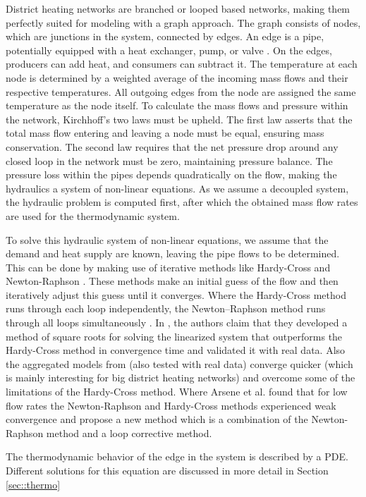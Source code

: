 District heating networks are branched or looped based networks, making them perfectly suited for modeling with a graph approach. The graph consists of nodes, which are junctions in the system, connected by edges. An edge is a pipe, potentially equipped with a heat exchanger, pump, or valve \cite{sibeijn2025economic}. On the edges, producers can add heat, and consumers can subtract it. The temperature at each node is determined by a weighted average of the incoming mass flows and their respective temperatures. All outgoing edges from the node are assigned the same temperature as the node itself. To calculate the mass flows and pressure within the network, Kirchhoff's two laws must be upheld. The first law asserts that the total mass flow entering and leaving a node must be equal, ensuring mass conservation. The second law requires that the net pressure drop around any closed loop in the network must be zero, maintaining pressure balance. The pressure loss within the pipes depends quadratically on the flow, making the hydraulics a system of non-linear equations. As we assume a decoupled system, the hydraulic problem is computed first, after which the obtained mass flow rates are used for the thermodynamic system. 

To solve this hydraulic system of non-linear equations, we assume that the demand and heat supply are known, leaving the pipe flows to be determined. This can be done by making use of iterative methods like Hardy-Cross \cite{HardyCross} and Newton-Raphson \cite{NewtonenHard}. These methods make an initial guess of the flow and then iteratively adjust this guess until it converges. Where the Hardy-Cross method runs through each loop independently, the Newton–Raphson method runs through all loops simultaneously \cite{NewtonenHard}. In \cite{STEVANOVIC}, the authors claim that they developed a method of square roots for solving the linearized system that outperforms the Hardy-Cross method in convergence time and validated it with real data. Also the aggregated models from \cite{LARSEN2002995} (also tested with real data) converge quicker (which is mainly interesting for big district heating networks) and overcome some of the limitations of the Hardy-Cross method. Where Arsene et al. \cite{ARSENE} found that for low flow rates the Newton-Raphson and Hardy-Cross methods experienced weak convergence and propose a new method which is a combination of the Newton-Raphson method and a loop corrective method. 

The thermodynamic behavior of the edge in the system is described by a PDE. Different solutions for this equation are discussed in more detail in Section \ref{sec::thermo}

